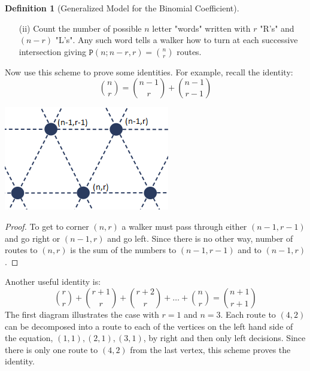 \documentclass[12pt, letterpaper, onecolumn, conference, final]{IEEEtran}
\theoremstyle{definition}
\newtheorem{definition}{Definition}[section]
\theoremstyle{plain}
\begin{document}
\begin{center}
{\begin{minipage}{7.3 in}
\begin{definition}[Generalized Model for the Binomial Coefficient]
\begin{itemize}
\vspace{.2cm}
\item[(ii)]
Count the number of possible $n$ letter "words" written with $r$ "R's" and $(n-r)$ "L's". Any such word tells a walker how to turn at each successive intersection giving $\mathtt{P}(n;n-r,r) = {n \choose r}$ routes.

\end{itemize}
\vspace{.3cm}
Now use this scheme to prove some identities. For example, recall the identity:
\begin{equation*}
{n \choose r} = {n-1 \choose r} + {n-1 \choose r-1}
\end{equation*}
\begin{center}
\includegraphics[scale=.2]{BC_Identity_Visualization.png}
\end{center}
\begin{proof}
To get to corner $(n,r)$ a walker must pass through either $(n-1,r-1)$ and go right or $(n-1,r)$ and go left. Since there is no other way, number of routes to $(n,r)$ is the sum of the numbers to $(n-1,r-1)$ and to $(n-1,r)$.
\end{proof}
Another useful identity is:
\begin{equation*}
{r \choose r} + {r+1 \choose r} + {r+2 \choose r} + \dots + {n \choose r} = {n+1 \choose r+1}
\end{equation*}
The first diagram illustrates the case with $r=1$ and $n=3$. Each route to $(4,2)$ can be decomposed into a route to each of the vertices on the left hand side of the equation, $(1,1), (2,1), (3,1)$, by right and then only left decisions. Since there is only one route to $(4,2)$ from the last vertex, this scheme proves the identity.
\end{definition}
\end{minipage}}
\end{center}
\end{document}
